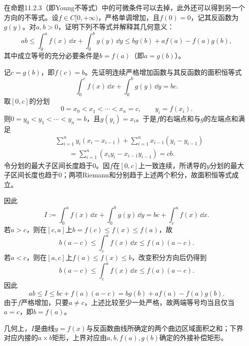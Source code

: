 \begin{xreferenceproblem}[6]
在命题11.2.3（即Young不等式）中的可微条件可以去掉，此外还可以得到另一个方向的不等式。设$f\in C[0,+\infty)$，严格单调增加，且$f(0)=0$，记其反函数为$g(y)$。对$a,b>0$，证明下列不等式并解释其几何意义：
  \[
    ab\le\int_0^af(x)\,\dd x+\int_0^bg(y)\,\dd y
    \le bg(b)+af(a)-f(a)g(b),
  \]
  其中成立等号的充分必要条件是$b=f(a)$（即$a=g(b)$）。
\end{xreferenceproblem}
\begin{xsolution}
记$c=g(b)$，即$f(c)=b$。先证明连续严格增加函数与其反函数的面积恒等式
\[
 \int_0^cf(x)\,\dd x+\int_0^bg(y)\,\dd y=bc.
\]
取$[0,c]$的分划
\[
 0=x_0<x_1<\cdots<x_n=c,
 \qquad y_i=f(x_i).
\]
则$0=y_0<y_1<\cdots<y_n=b$，且$g(y_i)=x_i$。于是$f$的右端点和与$g$的左端点和满足
\begin{align*}
&\sum_{i=1}^ny_i(x_i-x_{i-1})
 +\sum_{i=1}^nx_{i-1}(y_i-y_{i-1})\\
&\qquad=\sum_{i=1}^n(x_iy_i-x_{i-1}y_{i-1})
 =cb.
\end{align*}
令分划的最大子区间长度趋于0。因$f$在$[0,c]$上一致连续，所诱导的$y$分划的最大子区间长度也趋于0；两项Riemann和分别趋于上述两个积分，故面积恒等式成立。

因此
\[
 I:=\int_0^af(x)\,\dd x+\int_0^bg(y)\,\dd y
 =bc+\int_c^af(x)\,\dd x.
\]
若$a>c$，则在$[c,a]$上$b=f(c)\le f(x)\le f(a)$，故
\[
 b(a-c)\le\int_c^af(x)\,\dd x\le f(a)(a-c).
\]
若$a<c$，则在$[a,c]$上$f(a)\le f(x)\le b$，改变积分方向后仍得到
\[
 b(a-c)\le\int_c^af(x)\,\dd x\le f(a)(a-c).
\]
因此
\[
 ab\le I\le bc+f(a)(a-c)
 =bg(b)+af(a)-f(a)g(b).
\]
由于$f$严格增加，只要$a\ne c$，上述比较至少一处严格，故两端等号均当且仅当$a=c$，即$b=f(a)$。

几何上，$I$是曲线$y=f(x)$与反函数曲线所确定的两个曲边区域面积之和；下界对应内接的$a\times b$矩形，上界对应由$a,b,f(a),g(b)$确定的外接补偿矩形。
\end{xsolution}


